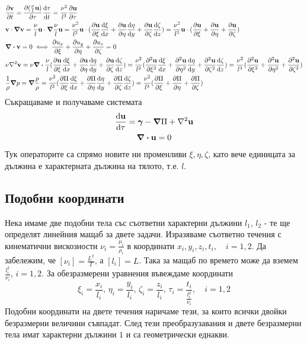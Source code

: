 \documentclass[bulgarian, 12pt]{article}
\begin{document}
\begin{align}
	&\pdv{\mathbf{v}}{t} = \pdv{(\frac{\nu}{l}\mathbf{u})}{\tau}\dv{\tau}{t} = \frac{\nu^2}{l^3} \pdv{\mathbf{u}}{\tau} \\
	&\mathbf{v} \cdot \grad \mathbf{v} = 
		\frac{\nu}{l} \mathbf{u} \cdot \grad \frac{\nu}{l} \mathbf{u} = 
		\frac{\nu^2}{l^2} \mathbf{u} \cdot (\pdv{\mathbf{u}}{\xi}\dv{\xi}{x} + \pdv{\mathbf{u}}{\eta}\dv{\eta}{y} + \pdv{\mathbf{u}}{\zeta}\dv{\zeta}{z}) =
		\frac{\nu^2}{l^3} \mathbf{u} \cdot (\pdv{\mathbf{u}}{\xi} + \pdv{\mathbf{u}}{\eta} + \pdv{\mathbf{u}}{\zeta}) \\
	& \div \mathbf{v} = 0 \iff \pdv{u_x}{\xi} + \pdv{u_y}{\eta} + \pdv{u_z}{\zeta} = 0 \\
	& \nu \laplacian \mathbf{v} = 
		\nu \div \frac{\nu}{l} (\pdv{\mathbf{u}}{\xi}\dv{\xi}{x} + \pdv{\mathbf{u}}{\eta}\dv{\eta}{y} + \pdv{\mathbf{u}}{\zeta}\dv{\zeta}{z}) = 
		\frac{\nu^2}{l^2} (\pdv[2]{\mathbf{u}}{\xi}\dv{\xi}{x} + \pdv[2]{\mathbf{u}}{\eta}\dv{\eta}{y} + \pdv[2]{\mathbf{u}}{\zeta}\dv{\zeta}{z}) =
		\frac{\nu^2}{l^3} (\pdv[2]{\mathbf{u}}{\xi} + \pdv[2]{\mathbf{u}}{\eta} + \pdv[2]{\mathbf{u}}{\zeta}) \\
	&\frac{1}{\rho}\grad p = 
		\grad \frac{p}{\rho} =
	 	\frac{\nu^2}{l^2} (\pdv{\Pi}{\xi}\dv{\xi}{x} + \pdv{\Pi}{\eta}\dv{\eta}{y} + \pdv{\Pi}{\zeta}\dv{\zeta}{z}) =
		\frac{\nu^2}{l^3} (\pdv{\Pi}{\xi} + \pdv{\Pi}{\eta} + \pdv{\Pi}{\zeta})
\end{align}
Съкращаваме и получаваме системата
\begin{gather}
	\dv{\mathbf{u}}{\tau} = \bm{\gamma} - \grad \Pi + \laplacian \mathbf{u} \\\nonumber
	\div \mathbf{u} = 0
\end{gather}
Тук операторите са спрямо новите ни променливи $\xi, \eta, \zeta$, като вече единицата за дължина е характерната дължина на тялото, т.е. $l$.

\subsection{Подобни координати}
Нека имаме две подобни тела със съответни характерни дължини $l_1$, $l_2$ - те ще определят линейния мащаб за двете задачи. 
Изразяваме съответно течения с кинематични вискозности $\nu_i = \frac{\mu_i}{\rho_i}$ в координати $x_i,y_i,z_i,t_i, \quad i=1,2$.
Да забележим, че $[\nu_i]=\frac{L^2}{T}$, а $[l_i]=L$.
Така за мащаб по времето може да вземем $\frac{l_i^2}{\nu_i},\, i=1,2$. 
За обезразмерени уравнения въвеждаме координати
\begin{equation}
	\xi_i = \frac{x_i}{l_i},\, \eta_i = \frac{y_i}{l_i},\, \zeta_i = \frac{z_i}{l_i},\, \tau_i = \frac{t_i}{\frac{l_i^2}{\nu_i}}, \quad i=1,2
\end{equation}
Подобни координати на двете течения наричаме тези, за които всички двойки безразмерни величини съвпадат.
След тези преобразузавания и двете безразмерни тела имат характерни дължини $1$ и са геометрически еднакви. 
\end{document}
